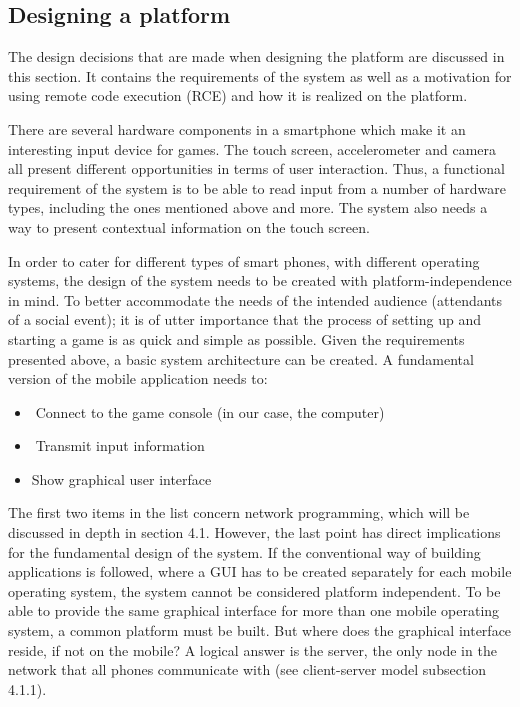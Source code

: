 \documentclass{article}
\begin{document}
\subsection{Designing a platform}
The design decisions that are made when designing the platform are discussed in this section. It
contains the requirements of the system as well as a motivation for using remote code execution
(RCE) and how it is realized on the platform.

There are several hardware components in a smartphone which make it an interesting input
device for games. The touch screen, accelerometer and camera all present different opportunities
in terms of user interaction. Thus, a functional requirement of the system is to be able to read
input from a number of hardware types, including the ones mentioned above and more. The
system also needs a way to present contextual information on the touch screen.

In order to cater for different types of smart phones, with different operating systems, the design
of the system needs to be created with platform-independence in mind. To better accommodate
the needs of the intended audience (attendants of a social event); it is of utter importance that the
process of setting up and starting a game is as quick and simple as possible.
Given the requirements presented above, a basic system architecture can be created. A
fundamental version of the mobile application needs to:
\begin{itemize}
\itemConnect to the game console (in our case, the computer)
\itemTransmit input information
\item Show graphical user interface
\end{itemize}
The first two items in the list concern network programming, which will be discussed in depth in
section 4.1. However, the last point has direct implications for the fundamental design of the
system. If the conventional way of building applications is followed, where a GUI has to be
created separately for each mobile operating system, the system cannot be considered platform
independent. To be able to provide the same graphical interface for more than one mobile
operating system, a common platform must be built. But where does the graphical interface
reside, if not on the mobile? A logical answer is the server, the only node in the network that all
phones communicate with (see client-server model subsection 4.1.1).
\end{document}
